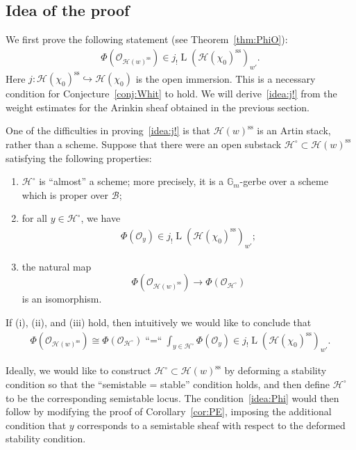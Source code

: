 \documentclass[11pt,oneside,a4paper,mathscr]{amsart}
\theoremstyle{definition}
\newcommand{\LL}{\operatorname{L}}
\newcommand{\cH}{\mathcal{H}}
\newcommand{\cB}{\mathcal{B}}
\newcommand{\cO}{\mathcal{O}}
\begin{document}
\subsection{Idea of the proof}\label{subsec:idea}
We first prove the following statement (see Theorem~\ref{thm:PhiO}):
\begin{align}\label{idea:j!}
\Phi(\cO_{\cH(w)^{\mathrm{ss}}}) \in j_{!}\LL(\cH(\chi_0)^{\mathrm{ss}})_{w'}.
\end{align}
Here $j \colon \cH(\chi_0)^{\mathrm{ss}} \hookrightarrow \cH(\chi_0)$ is the open immersion. 
This is a necessary condition for Conjecture~\ref{conj:Whit} to hold.
We will derive~\eqref{idea:j!} from the weight estimates for the Arinkin sheaf obtained in 
the previous section. 

One of the difficulties in proving~\eqref{idea:j!} is that $\cH(w)^{\mathrm{ss}}$ is an Artin stack, 
rather than a scheme. Suppose that there were an open substack
$\cH^{\circ} \subset \cH(w)^{\mathrm{ss}}$
satisfying the following properties:
\begin{enumerate}
    \item $\cH^\circ$ is ``almost'' a scheme; more precisely, it is a $\mathbb{G}_m$-gerbe over a 
    scheme which is proper over $\cB$;
    \item for all $y\in \cH^{\circ}$, we have 
    \begin{align}\label{idea:Phi}
        \Phi(\cO_y) \in  j_{!}\LL(\cH(\chi_0)^{\mathrm{ss}})_{w'};
    \end{align}
    \item the natural map
    \[
        \Phi(\cO_{\cH(w)^{\mathrm{ss}}})\to \Phi(\cO_{\cH^{\circ}})
    \]
    is an isomorphism. 
\end{enumerate}
If (i), (ii), and (iii) hold, then intuitively we would like to conclude that
\begin{align*}
   \Phi(\cO_{\cH(w)^{\mathrm{ss}}})
   \cong \Phi(\cO_{\cH^{\circ}}) 
   \mathrel{\text{``=``}} 
   \int_{y\in \cH^{\circ}}\Phi(\mathcal{O}_y)
   \in j_{!}\LL(\cH(\chi_0)^{\mathrm{ss}})_{w'}.
\end{align*}

Ideally, we would like to construct $\cH^{\circ} \subset \cH(w)^{\mathrm{ss}}$ by deforming a 
stability condition so that the ``semistable = stable'' condition holds, and then define
$\cH^{\circ}$ to be the corresponding semistable locus. The condition~\eqref{idea:Phi} would then
follow by modifying the proof of Corollary~\ref{cor:PE}, imposing the additional condition that
$y$ corresponds to a semistable sheaf with respect to the deformed stability condition. 
\end{document}
